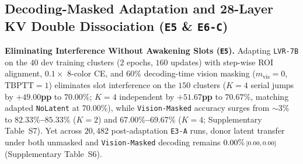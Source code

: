 \subsection{Decoding-Masked Adaptation and 28-Layer KV Double Dissociation (\texttt{E5} \& \texttt{E6-C})}
\label{subsec:exp_e5_e6c}

\textbf{Eliminating Interference Without Awakening Slots (\texttt{E5}).} Adapting \texttt{LVR-7B} on the $40$ dev training clusters ($2$ epochs, $160$ updates) with step-wise ROI alignment, $0.1\times$ 8-color CE, and $60\%$ decoding-time vision masking ($m_{\mathrm{vis}}=0$, $\mathrm{TBPTT}=1$) eliminates slot interference on the $150$ clusters ($K=4$ serial jumps by $\mathbf{+49.00}$\textbf{pp} to $70.00\%$; $K=4$ independent by $\mathbf{+51.67}$\textbf{pp} to $70.67\%$, matching adapted \texttt{NoLatent} at $70.00\%$), while \texttt{Vision-Masked} accuracy surges from ${\sim}3\%$ to \textbf{$82.33\%$--$85.33\%$} ($K=2$) and \textbf{$67.00\%$--$69.67\%$} ($K=4$; Supplementary Table~S7). Yet across $20,482$ post-adaptation \texttt{E3-A} runs, donor latent transfer under both unmasked and \texttt{Vision-Masked} decoding remains \textbf{$0.00\%\ci{0.00}{0.00}$} (Supplementary Table~S6).

